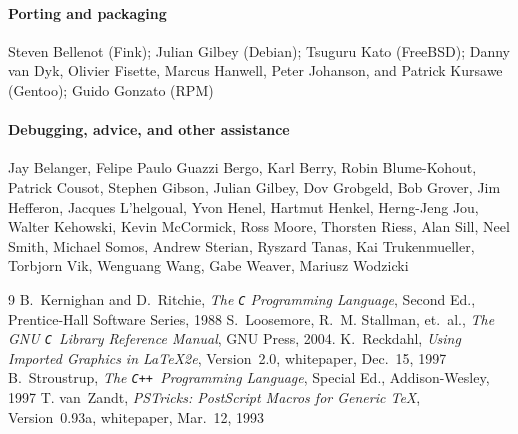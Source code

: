 \documentclass[12pt]{report}
\newcommand{\code}[1]{\texttt{#1}}
\newcommand{\CXX}{\code{C++}}
\begin{document}
\paragraph{Porting and packaging} Steven Bellenot (Fink); 
Julian Gilbey (Debian); Tsuguru Kato (FreeBSD); Danny van Dyk, Olivier
Fisette, Marcus Hanwell, Peter Johanson, and Patrick Kursawe (Gentoo);
Guido Gonzato (RPM)

\paragraph{Debugging, advice, and other assistance} Jay Belanger,
Felipe Paulo Guazzi Bergo, Karl Berry, Robin Blume-Kohout, Patrick
Cousot, Stephen Gibson, Julian Gilbey, Dov Grobgeld, Bob Grover, Jim
Hefferon, Jacques L'helgoual, Yvon Henel, Hartmut Henkel, Herng-Jeng
Jou, Walter Kehowski, Kevin McCormick, Ross Moore, Thorsten Riess,
Alan Sill, Neel Smith, Michael Somos, Andrew Sterian, Ryszard Tanas,
Kai Trukenmueller, Torbjorn Vik, Wenguang Wang, Gabe Weaver, Mariusz
Wodzicki

\begin{thebibliography}{9}
%
 B.~Kernighan and D.~Ritchie, \emph{The \code{C}
    Programming Language}, Second Ed., Prentice-Hall Software Series,
    1988
%
 S.~Loosemore, R.~M. Stallman, et.\ al., \emph{The GNU
    \code{C}~Library Reference Manual}, GNU Press, 2004.
%
 K.~Reckdahl, \emph{Using Imported Graphics in \LaTeX2e},
  Version~2.0, whitepaper, Dec.~15, 1997
%
 B.~Stroustrup, \emph{The \CXX\ Programming Language},
  Special Ed., Addison-Wesley, 1997
%
 T. van~Zandt, \emph{PSTricks: PostScript Macros for
    Generic \TeX}, Version~0.93a, whitepaper, Mar.~12, 1993
%
\end{thebibliography}

\clearpage

\printindex
\end{document}
